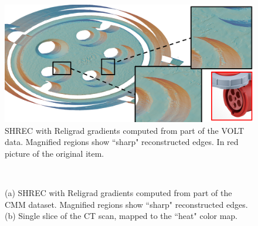\begin{figure}[t]
\centering
	\includegraphics[width=\linewidth]{images/volt.eps}
	\caption{SHREC with Religrad gradients computed from part of the VOLT data. Magnified regions show ``sharp" reconstructed edges. In red picture of the original item.}
	\label{fig:ict:volt}
\end{figure}

\begin{figure}[t]
	\centering
	\\
	\caption{(a) SHREC with Religrad gradients computed from part of the CMM dataset. Magnified regions show ``sharp" reconstructed edges. (b) Single slice of the CT scan, mapped to the ``heat" color map.}\label{fig:ict:CMM}
\end{figure}

